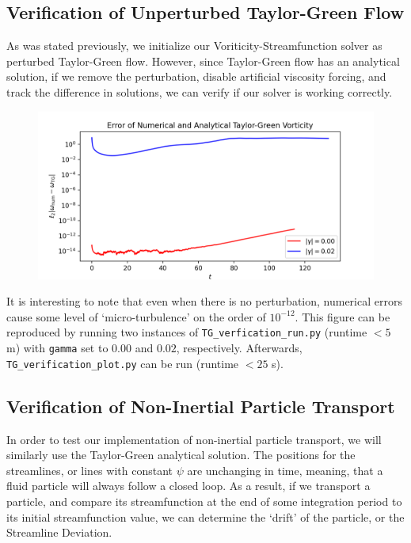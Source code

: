 \documentclass[12pt, reqno]{amsart}
\begin{document}
\subsection{Verification of Unperturbed Taylor-Green Flow}
As was stated previously, we initialize our Voriticity-Streamfunction solver as perturbed Taylor-Green flow. However, since Taylor-Green flow has an analytical solution, if we remove the perturbation, disable artificial viscosity forcing, and track the difference in solutions, we can verify if our solver is working correctly.

\begin{figure}[H]
    \centering
    \includegraphics[width = 1\linewidth]{TG_verification_plot.png}
\end{figure}

It is interesting to note that even when there is no perturbation, numerical errors cause some level of `micro-turbulence' on the order of $10^{-12}$. This figure can be reproduced by running two instances of \texttt{TG\_verfication\_run.py} (runtime $<5$ m) with \texttt{gamma} set to $0.00$ and $0.02$, respectively. Afterwards, \texttt{TG\_verification\_plot.py} can be run (runtime $<25$ s).

\subsection{Verification of Non-Inertial Particle Transport}
In order to test our implementation of non-inertial particle transport, we will similarly use the Taylor-Green analytical solution. The positions for the streamlines, or lines with constant $\psi$ are unchanging in time, meaning, that a fluid particle will always follow a closed loop. As a result, if we transport a particle, and compare its streamfunction at the end of some integration period to its initial streamfunction value, we can determine the `drift' of the particle, or the Streamline Deviation.
\end{document}
